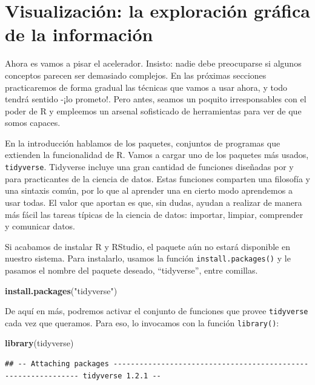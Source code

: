 \documentclass[]{book}
\newenvironment{Shaded}{\begin{snugshade}}{\end{snugshade}}
\newcommand{\KeywordTok}[1]{\textcolor[rgb]{0.13,0.29,0.53}{\textbf{#1}}}
\newcommand{\StringTok}[1]{\textcolor[rgb]{0.31,0.60,0.02}{#1}}
\newcommand{\NormalTok}[1]{#1}
\begin{document}
\section{Visualización: la exploración gráfica de la
información}\label{visualizacion-la-exploracion-grafica-de-la-informacion}

Ahora es vamos a pisar el acelerador. Insisto: nadie debe preocuparse si
algunos conceptos parecen ser demasiado complejos. En las próximas
secciones practicaremos de forma gradual las técnicas que vamos a usar
ahora, y todo tendrá sentido -¡lo prometo!. Pero antes, seamos un
poquito irresponsables con el poder de R y empleemos un arsenal
sofisticado de herramientas para ver de que somos capaces.

En la introducción hablamos de los paquetes, conjuntos de programas que
extienden la funcionalidad de R. Vamos a cargar uno de los paquetes más
usados, \texttt{tidyverse}. Tidyverse incluye una gran cantidad de
funciones diseñadas por y para practicantes de la ciencia de datos.
Estas funciones comparten una filosofía y una sintaxis común, por lo que
al aprender una en cierto modo aprendemos a usar todas. El valor que
aportan es que, sin dudas, ayudan a realizar de manera más fácil las
tareas típicas de la ciencia de datos: importar, limpiar, comprender y
comunicar datos.

Si acabamos de instalar R y RStudio, el paquete aún no estará disponible
en nuestro sistema. Para instalarlo, usamos la función
\texttt{install.packages()} y le pasamos el nombre del paquete deseado,
``tidyverse'', entre comillas.

\begin{Shaded}
\begin{Highlighting}[]
\KeywordTok{install.packages}\NormalTok{(}\StringTok{"tidyverse"}\NormalTok{)}
\end{Highlighting}
\end{Shaded}

De aquí en más, podremos activar el conjunto de funciones que provee
\texttt{tidyverse} cada vez que queramos. Para eso, lo invocamos con la
función \texttt{library()}:

\begin{Shaded}
\begin{Highlighting}[]
\KeywordTok{library}\NormalTok{(tidyverse)}
\end{Highlighting}
\end{Shaded}

\begin{verbatim}
## -- Attaching packages -------------------------------------------------------------- tidyverse 1.2.1 --
\end{verbatim}
\end{document}
